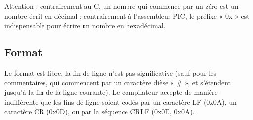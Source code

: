 Attention :
contrairement au C, un nombre qui commence par un zéro est un nombre écrit en décimal ;
contrairement à l’assembleur PIC, le préfixe « 0x » est indispensable pour écrire un nombre en hexadécimal.

\subsection{Format}

Le format est libre, la fin de ligne n’est pas significative (sauf pour les commentaires, qui commencent par un caractère dièse « \# », et s’étendent jusqu’à la fin de la ligne courante). Le compilateur accepte de manière indifférente que les fins de ligne soient codés par un caractère LF (0x0A), un caractère CR (0x0D), ou par la séquence CRLF (0x0D, 0x0A).

